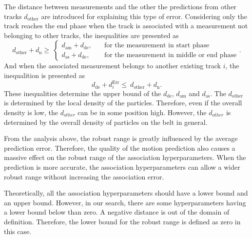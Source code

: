 The distance between measurements and the other the predictions from other tracks $d_{\mathrm{other}}$ are introduced for explaining this type of error. Considering only the track reaches the end phase when the track is associated with a measurement not belonging to other tracks, the inequalities are presented as 
\begin{equation}
    \label{assoeq2}
    d_{\mathrm{other}} + d_{\mathrm{n}}\geqslant\  
    \left \{
    \begin{array}{ll}
    d_{\mathrm{am}} + d_{\mathrm{de}} ,\quad&\textrm{for the measurement in start phase}\\ 
    d_{\mathrm{as}} + d_{\mathrm{de}} ,\quad&\textrm{for the measurement in middle or end phase}
    \end{array}.  
    \right.  
\end{equation}
And when the associated measurement belongs to another existing track $i$, the inequalition is presented as
\begin{equation}
    d_{\mathrm{de}} + d_{i}^{\mathrm{Err}} \leqslant\  d_{\mathrm{other}} + d_{\mathrm{n}}.
    \label{assoeq3}
\end{equation}
These inequalities determine the upper bound of the $d_{\mathrm{de}}$, $d_{\mathrm{am}}$ and $d_{\mathrm{as}}$. The $d_{\mathrm{other}}$ is determined by the local density of the particles. Therefore, even if the overall density is low, the $d_{other}$ can be in some position high. However, the $d_{other}$ is determined by the overall density of particles on the belt in general.

From the analysis above, the robust range is greatly influenced by the average prediction error. Therefore, the quality of the motion prediction also causes a massive effect on the robust range of the association hyperparameters. When the prediction is more accurate, the association hyperparameters can allow a wider robust range without increasing the association error.

Theoretically, all the association hyperparameters should have a lower bound and an upper bound. However, in our search, there are some hyperparameters having a lower bound below than zero. A negative distance is out of the domain of definition. Therefore, the lower bound for the robust range is defined as zero in this case.



